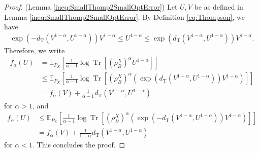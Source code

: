 \documentclass{article}
\begin{document}
\begin{proof}(Lemma \ref{ineq:SmallThomp2SmallOptError})
    Let $U,V$ be as defined in Lemma \ref{ineq:SmallThomp2SmallOptError}.
    By Definition \ref{eq:Thompson}, we have
    \begin{align}
        \exp\left(- d_{\mathrm{T}}
        \left(V^{1-\alpha},U^{1-\alpha}\right)\right)V^{1-\alpha}
        \leq U^{1-\alpha}
        \leq\exp\left( d_{\mathrm{T}}
        \left(V^{1-\alpha},U^{1-\alpha}\right)\right)V^{1-\alpha}.
    \end{align}
    Therefore, we write
    \begin{align}
        f_{\alpha}\left(U\right)
        &=\mathbb{E}_{P_X}\left[\frac{1}{\alpha-1}\log\operatorname{Tr}\left[ \left(\rho_B^X\right)^{\alpha} U^{1-\alpha}\right]\right]\nonumber\\
        &\leq\mathbb{E}_{P_X}\left[\frac{1}{\alpha-1}\log\operatorname{Tr}\left[ \left(\rho_B^X\right)^{\alpha}\left(\exp\left( d_{\mathrm{T}}\left(V^{1-\alpha},U^{1-\alpha}\right)\right)V^{1-\alpha}\right)\right]\right]\nonumber\\
        &=f_{\alpha}\left(V\right)+\frac{1}{\alpha-1}d_{\mathrm{T}}\left(V^{1-\alpha},U^{1-\alpha}\right)\nonumber
    \end{align}
    for $\alpha>1$, and
    \begin{align}
        f_{\alpha}\left(U\right)
        &\leq\mathbb{E}_{P_X}\left[\frac{1}{\alpha-1}\log\operatorname{Tr}\left[ \left(\rho_B^X\right)^{\alpha}\left(\exp\left( -d_{\mathrm{T}}\left(V^{1-\alpha},U^{1-\alpha}\right)\right)V^{1-\alpha}\right)\right]\right]\nonumber\\
        &=f_{\alpha}\left(V\right)+\frac{1}{1-\alpha} d_{\mathrm{T}}\left(V^{1-\alpha},U^{1-\alpha}\right)\nonumber
    \end{align}
    for $\alpha<1$.
    This concludes the proof.
    
\end{proof}
\end{document}
